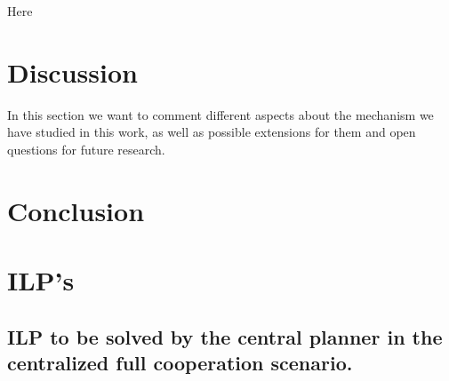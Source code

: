 \documentclass[review]{elsarticle}
\begin{document}
Here
\section{Discussion} \label{seq:discussion}

In this section we want to comment different aspects about the mechanism we have studied in this work, as well as possible extensions for them and open questions for future research.


\section{Conclusion} \label{seq:conclusion}




\appendix
\section{ILP's}
\label{seq:appendixilp}

\subsection{ILP to be solved by the central planner in the centralized full cooperation scenario.}
\end{document}
